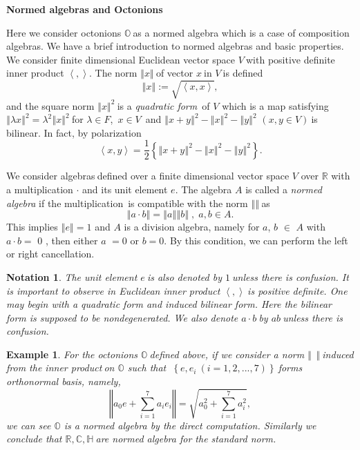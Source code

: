 \documentclass[a4paper]{article}%
\newtheorem{example}[theorem]{Example}
\newtheorem{notation}[theorem]{Notation}
\begin{document}
\bigskip

\begin{center}
\textbf{Normed algebras and Octonions}
\end{center}

Here we consider octonions $\mathbb{O\ }$as a normed algebra which is a case
of composition algebras. We have a brief introduction to normed algebras and
basic properties. We consider finite dimensional Euclidean vector space
$V\ $with positive definite inner product $\left\langle ,\right\rangle $. The
norm $\left\Vert x\right\Vert \ $of vector $x\ $in $V\ $is defined
\[
\left\Vert x\right\Vert :=\sqrt{\left\langle x,x\right\rangle },
\]
and the square norm $\left\Vert x\right\Vert ^{2}\ $is a \textit{quadratic
form\ }of $V$ which is a map satisfying $\left\Vert \lambda x\right\Vert
^{2}=\lambda^{2}\left\Vert x\right\Vert ^{2}\ $for $\lambda\in F$,\ $x\in
V$\ and $\left\Vert x+y\right\Vert ^{2}-\left\Vert x\right\Vert ^{2}%
-\left\Vert y\right\Vert ^{2}$ $\left(  x,y\in V\right)  \ $is bilinear. In
fact, by polarization
\[
\left\langle x,y\right\rangle =\frac{1}{2}\left\{  \left\Vert x+y\right\Vert
^{2}-\left\Vert x\right\Vert ^{2}-\left\Vert y\right\Vert ^{2}\right\}  .
\]


We consider algebras$\ $defined over a finite dimensional vector space $V$
over $\mathbb{R}$ with a multiplication $\cdot$ and its unit element $e$. The
algebra $A$ is called a \textit{normed algebra} if the multiplication\ is
compatible with the norm $\left\Vert {}\right\Vert \ $as
\[
\left\Vert a\cdot b\right\Vert =\left\Vert a\right\Vert \left\Vert
b\right\Vert \;,\;a,b\in A.
\]
This implies $\left\Vert e\right\Vert =1$ and $A$ is a division algebra,
namely for $a$, $b$ $\in$ $A$ with $a\cdot b=$ $0$ , then either $a$ $=0$ or
$b=0$. By this condition, we can perform the left or right cancellation.

\begin{notation}
The unit element $e\ $is also denoted by $1\ $unless there is confusion. It is
important to observe in Euclidean inner product $\left\langle ,\right\rangle
\ $is positive definite. One may begin with a quadratic form and induced
bilinear form. Here the bilinear form is supposed to be nondegenerated. We
also denote $a\cdot b\ $by $ab\ $unless there is confusion.
\end{notation}

\begin{example}
For the octonions $\mathbb{O\ }$defined above, if we consider a norm
$\left\Vert \ \ \right\Vert \ $induced from the inner product$\ $on
$\mathbb{O}$ such that $\ \left\{  e,e_{i}\ \left(  i=1,2,...,7\right)
\right\}  \ $forms orthonormal basis, namely,\
\[
\left\Vert a_{0}e+\sum_{i=1}^{7}a_{i}e_{i}\right\Vert =\sqrt{a_{0}^{2}%
+\sum_{i=1}^{7}a_{i}^{2}},
\]
we can see $\mathbb{O}$ is a normed algebra by the direct computation.
Similarly we conclude that $\mathbb{R},\mathbb{C},\mathbb{H\ }$are normed
algebra for the standard norm.
\end{example}
\end{document}
